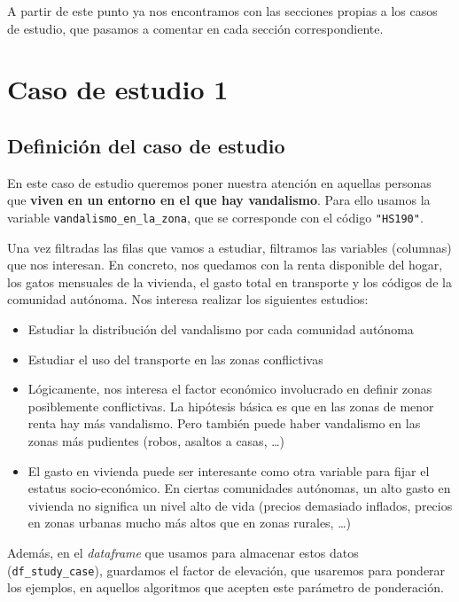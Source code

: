 \documentclass[11pt]{article}
\begin{document}
A partir de este punto ya nos encontramos con las secciones propias a los casos de estudio, que pasamos a comentar en cada sección correspondiente.

\pagebreak

\section{Caso de estudio 1}

\subsection{Definición del caso de estudio} \label{stcase01_definicion:seccion}

En este caso de estudio queremos poner nuestra atención en aquellas personas que \textbf{viven en un entorno en el que hay vandalismo}. Para ello usamos la variable \lstinline{vandalismo_en_la_zona}, que se corresponde con el código \lstinline{"HS190"}.

Una vez filtradas las filas que vamos a estudiar, filtramos las variables (columnas) que nos interesan. En concreto, nos quedamos con la renta disponible del hogar, los gatos mensuales de la vivienda, el gasto total en transporte y los códigos de la comunidad autónoma. Nos interesa realizar los siguientes estudios:

\begin{itemize}
    \item Estudiar la distribución del vandalismo por cada comunidad autónoma
    \item Estudiar el uso del transporte en las zonas conflictivas
    \item Lógicamente, nos interesa el factor económico involucrado en definir zonas posiblemente conflictivas. La hipótesis básica es que en las zonas de menor renta hay más vandalismo. Pero también puede haber vandalismo en las zonas más pudientes (robos, asaltos a casas, \ldots)
    \item El gasto en vivienda puede ser interesante como otra variable para fijar el estatus socio-económico. En ciertas comunidades autónomas, un alto gasto en vivienda no significa un nivel alto de vida (precios demasiado inflados, precios en zonas urbanas mucho más altos que en zonas rurales, \ldots)
\end{itemize}

Además, en el \emph{dataframe} que usamos para almacenar estos datos (\lstinline{df_study_case}), guardamos el factor de elevación, que usaremos para ponderar los ejemplos, en aquellos algoritmos que acepten este parámetro de ponderación.
\end{document}
